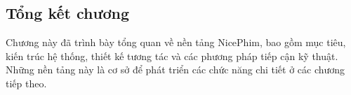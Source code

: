 
\subsection{Tổng kết chương}

Chương này đã trình bày tổng quan về nền tảng NicePhim, bao gồm mục tiêu, kiến trúc hệ thống, thiết kế tương tác và các phương pháp tiếp cận kỹ thuật. Những nền tảng này là cơ sở để phát triển các chức năng chi tiết ở các chương tiếp theo.
